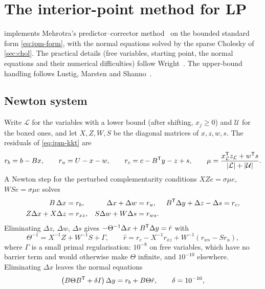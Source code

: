 \section{The interior-point method for LP}\label{sec:ipm}

 implements Mehrotra's predictor--corrector method~\cite{mehrotra1992} on the bounded
standard form \eqref{eq:ipm-form}, with the normal equations solved by the sparse Cholesky of
\cref{sec:chol}. The practical details (free variables, starting point, the normal equations and
their numerical difficulties) follow Wright~\cite[ch.~10--11]{wright1997}. The upper-bound handling
follows Lustig, Marsten and Shanno~\cite{lustig1994}.

\subsection{Newton system}
Write $\mathcal L$ for the variables with a lower bound (after shifting, $x_j\ge0$) and $\mathcal U$
for the boxed ones, and let $X,Z,W,S$ be the diagonal matrices of $x,z,w,s$. The residuals of
\eqref{eq:ipm-kkt} are
\begin{equation}\label{eq:ipm-res}
  r_b = b - Bx,\qquad r_u = U - x - w,\qquad r_c = c - B^{\mathsf{T}} y - z + s,\qquad
  \mu = \frac{x_{\mathcal L}^{\mathsf{T}} z_{\mathcal L} + w^{\mathsf{T}} s}{|\mathcal L|+|\mathcal U|}.
\end{equation}
A Newton step for the perturbed complementarity conditions $XZe=\sigma\mu e$, $WSe=\sigma\mu e$
solves
\begin{equation}\label{eq:newton}
\begin{aligned}
  B\,\Delta x &= r_b, & \Delta x+\Delta w &= r_u, & B^{\mathsf{T}}\Delta y+\Delta z-\Delta s &= r_c,\\
  Z\Delta x + X\Delta z &= r_{xz}, & S\Delta w + W\Delta s &= r_{ws}. &&
\end{aligned}
\end{equation}
Eliminating $\Delta z$, $\Delta w$, $\Delta s$ gives $-\Theta^{-1}\Delta x + B^{\mathsf{T}}\Delta y=\hat r$ with
\begin{equation}\label{eq:theta}
  \Theta^{-1} = X^{-1}Z + W^{-1}S + \Gamma,\qquad
  \hat r = r_c - X^{-1}r_{xz} + W^{-1}(r_{ws}-S r_u),
\end{equation}
where $\Gamma$ is a small primal regularisation: $10^{-8}$ on free variables, which have no barrier
term and would otherwise make $\Theta$ infinite, and $10^{-10}$ elsewhere. Eliminating $\Delta x$
leaves the normal equations
\begin{equation}\label{eq:normal}
  \bigl(B\Theta B^{\mathsf{T}} + \delta I\bigr)\,\Delta y = r_b + B\Theta\hat r,\qquad \delta = 10^{-10},
\end{equation}
